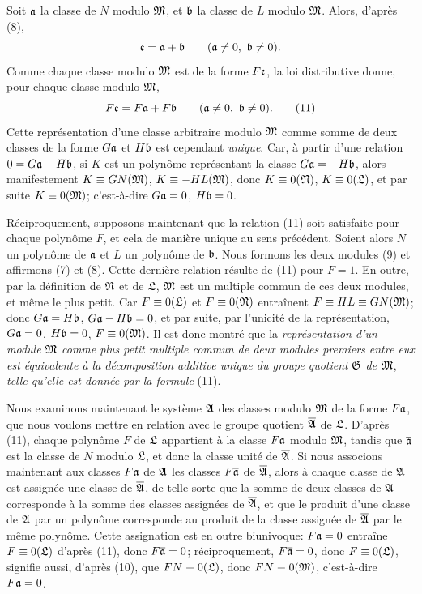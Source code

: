 Soit $\mathfrak{a}$ la classe de $N$ modulo $\mathfrak{M}$, et $\mathfrak{b}$ la classe de $L$ modulo $\mathfrak{M}$. Alors, d'après (8),
\[
 \mathfrak{e}=\mathfrak{a}+\mathfrak{b}\qquad(\mathfrak{a}\ne0,\ \mathfrak{b}\ne0).
\]
Comme chaque classe modulo $\mathfrak{M}$ est de la forme $F\mathfrak{e}$, la loi distributive donne, pour chaque classe modulo $\mathfrak{M}$,
\begin{equation}
 F\mathfrak{e}=F\mathfrak{a}+F\mathfrak{b}\qquad(\mathfrak{a}\ne0,\ \mathfrak{b}\ne0).
\tag{11}
\end{equation}
Cette représentation d'une classe arbitraire modulo $\mathfrak{M}$ comme somme de deux classes de la forme $G\mathfrak{a}$ et $H\mathfrak{b}$ est cependant \emph{unique}. Car, à partir d'une relation $0=G\mathfrak{a}+H\mathfrak{b}$, si $K$ est un polynôme représentant la classe $G\mathfrak{a}=-H\mathfrak{b}$, alors manifestement $K\equiv GN(\mathfrak{M})$, $K\equiv-HL(\mathfrak{M})$, donc $K\equiv0(\mathfrak{N})$, $K\equiv0(\mathfrak{L})$, et par suite $K\equiv0(\mathfrak{M})$; c'est-à-dire $G\mathfrak{a}=0$, $H\mathfrak{b}=0$.

Réciproquement, supposons maintenant que la relation (11) soit satisfaite pour chaque polynôme $F$, et cela de manière unique au sens précédent. Soient alors $N$ un polynôme de $\mathfrak{a}$ et $L$ un polynôme de $\mathfrak{b}$. Nous formons les deux modules (9) et affirmons (7) et (8). Cette dernière relation résulte de (11) pour $F=1$. En outre, par la définition de $\mathfrak{N}$ et de $\mathfrak{L}$, $\mathfrak{M}$ est un multiple commun de ces deux modules, et même le plus petit. Car $F\equiv0(\mathfrak{L})$ et $F\equiv0(\mathfrak{N})$ entraînent $F\equiv HL\equiv GN(\mathfrak{M})$; donc $G\mathfrak{a}=H\mathfrak{b}$, $G\mathfrak{a}-H\mathfrak{b}=0$, et par suite, par l'unicité de la représentation, $G\mathfrak{a}=0$, $H\mathfrak{b}=0$, $F\equiv0(\mathfrak{M})$. Il est donc montré que la \emph{représentation d'un module} $\mathfrak{M}$ \emph{comme plus petit multiple commun de deux modules premiers entre eux est équivalente à la décomposition additive unique du groupe quotient} $\mathfrak{G}$ \emph{de} $\mathfrak{M}$, \emph{telle qu'elle est donnée par la formule} (11).

Nous examinons maintenant le système $\mathfrak{A}$ des classes modulo $\mathfrak{M}$ de la forme $F\mathfrak{a}$, que nous voulons mettre en relation avec le groupe quotient $\overline{\mathfrak A}$ de $\mathfrak{L}$. D'après (11), chaque polynôme $F$ de $\mathfrak{L}$ appartient à la classe $F\mathfrak{a}$ modulo $\mathfrak{M}$, tandis que $\overline{\mathfrak{a}}$ est la classe de $N$ modulo $\mathfrak{L}$, et donc la classe unité de $\overline{\mathfrak A}$. Si nous associons maintenant aux classes $F\mathfrak{a}$ de $\mathfrak{A}$ les classes $F\overline{\mathfrak{a}}$ de $\overline{\mathfrak A}$, alors à chaque classe de $\mathfrak{A}$ est assignée une classe de $\overline{\mathfrak A}$, de telle sorte que la somme de deux classes de $\mathfrak{A}$ corresponde à la somme des classes assignées de $\overline{\mathfrak A}$, et que le produit d'une classe de $\mathfrak{A}$ par un polynôme corresponde au produit de la classe assignée de $\overline{\mathfrak A}$ par le même polynôme. Cette assignation est en outre biunivoque: $F\mathfrak{a}=0$ entraîne $F\equiv0(\mathfrak{L})$ d'après (11), donc $F\overline{\mathfrak{a}}=0$; réciproquement, $F\overline{\mathfrak{a}}=0$, donc $F\equiv0(\mathfrak{L})$, signifie aussi, d'après (10), que $FN\equiv0(\mathfrak{L})$, donc $FN\equiv0(\mathfrak{M})$, c'est-à-dire $F\mathfrak{a}=0$.

